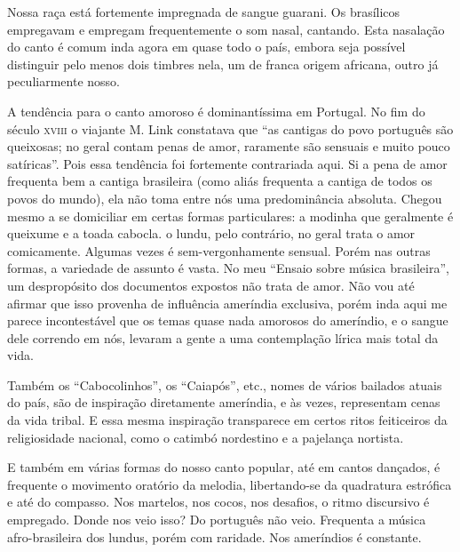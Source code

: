 Nossa raça está fortemente impregnada de sangue guarani. Os brasílicos
empregavam e empregam frequentemente o som nasal, cantando. Esta
nasalação do canto é comum inda agora em quase todo o país, embora seja
possível distinguir pelo menos dois timbres nela, um de franca origem
africana, outro já peculiarmente nosso.

A tendência para o canto amoroso é dominantíssima em Portugal. No fim do
século \textsc{xviii} o viajante M. Link constatava que ``as cantigas do povo
português são queixosas; no geral contam penas de amor, raramente são
sensuais e muito pouco satíricas''. Pois essa tendência foi fortemente
contrariada aqui. Si a pena de amor frequenta bem a cantiga brasileira
(como aliás frequenta a cantiga de todos os povos do mundo), ela não
toma entre nós uma predominância absoluta. Chegou mesmo a se domiciliar
em certas formas particulares: a modinha que geralmente é queixume e a
toada cabocla. o lundu, pelo contrário, no geral trata o amor
comicamente. Algumas vezes é sem-vergonhamente sensual. Porém nas outras
formas, a variedade de assunto é vasta. No meu ``Ensaio sobre música
brasileira'', um despropósito dos documentos expostos não trata de amor.
Não vou até afirmar que isso provenha de influência ameríndia exclusiva,
porém inda aqui me parece incontestável que os temas quase nada amorosos
do ameríndio, e o sangue dele correndo em nós, levaram a gente a uma
contemplação lírica mais total da vida.

Também os ``Cabocolinhos'', os ``Caiapós'', etc., nomes de vários
bailados atuais do país, são de inspiração diretamente ameríndia, e às
vezes, representam cenas da vida tribal. E essa mesma inspiração
transparece em certos ritos feiticeiros da religiosidade nacional, como
o catimbó nordestino e a pajelança nortista.

E também em várias formas do nosso canto popular, até em cantos
dançados, é frequente o movimento oratório da melodia, libertando-se da
quadratura estrófica e até do compasso. Nos martelos, nos cocos, nos
desafios, o ritmo discursivo é empregado. Donde nos veio isso? Do
português não veio. Frequenta a música afro-brasileira dos lundus, porém
com raridade. Nos ameríndios é constante.

